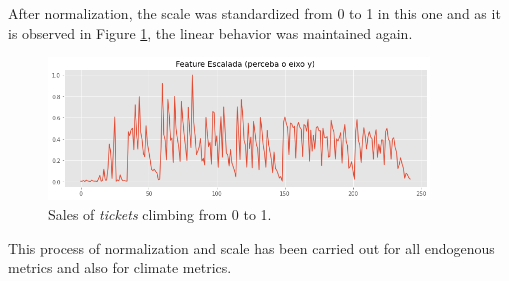                 
                        \begin{figure}[H]
                        \end{figure}
                        
                        
                        After normalization, the scale was standardized from 0 to 1 in this one and as it is observed in Figure  \ref{fig:feature_sem_outliers_escalada}, the linear behavior was maintained again.
                        
                        \begin{figure}[H]
                        	\center
                        	{                    		
                            	\includegraphics[width=0.9\textwidth]{./Figuras/resultados/feature_sem_outliers_escalada.png}
                            	\caption{Sales of \textit{tickets} climbing from 0 to 1.} \label{fig:feature_sem_outliers_escalada} 
                        	}
                        \end{figure}
                       
                This process of normalization and scale has been carried out for all endogenous metrics and also for climate metrics.
        	   
